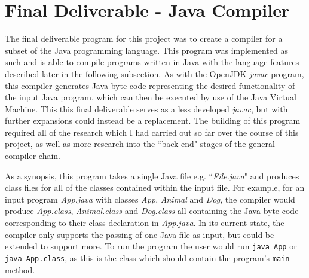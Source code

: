 \documentclass[a4paper, 11pt]{article}
\begin{document}
\newpage
\newpage\section{Final Deliverable - Java Compiler}
The final deliverable program for this project was to create a compiler for a subset of the Java programming language. This program was implemented as such and is able to compile programs written in Java with the language features described later in the following subsection. As with the OpenJDK\cite{OpenJDK} \textit{javac} program, this compiler generates Java byte code representing the desired functionality of the input Java program, which can then be executed by use of the Java Virtual Machine. This this final deliverable serves as a less developed \textit{javac}, but with further expansions could instead be a replacement. The building of this program required all of the research which I had carried out so far over the course of this project, as well as more research into the ``back end" stages of the general compiler chain. 

As a synopsis, this program takes a single Java file e.g. ``\textit{File.java}" and produces class files for all of the classes contained within the input file. For example, for an input program \textit{App.java} with classes \textit{App}, \textit{Animal} and \textit{Dog}, the compiler would produce \textit{App.class}, \textit{Animal.class} and \textit{Dog.class} all containing the Java byte code corresponding to their class declaration in \textit{App.java}. In its current state, the compiler only supports the passing of one Java file as input, but could be extended to support more. To run the program the user would run \texttt{java App} or \texttt{java App.class}, as this is the class which should contain the program's \texttt{main} method.
\end{document}
